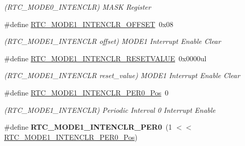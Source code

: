 \begin{DoxyCompactItemize}
\begin{DoxyCompactList}\small\item\em (R\+T\+C\+\_\+\+M\+O\+D\+E0\+\_\+\+I\+N\+T\+E\+N\+C\+L\+R) M\+A\+S\+K Register \end{DoxyCompactList}\item 
\hypertarget{group___s_a_m_l21___r_t_c_ga7c25664625a464e491e269a25d995f8b}{}\#define \hyperlink{group___s_a_m_l21___r_t_c_ga7c25664625a464e491e269a25d995f8b}{R\+T\+C\+\_\+\+M\+O\+D\+E1\+\_\+\+I\+N\+T\+E\+N\+C\+L\+R\+\_\+\+O\+F\+F\+S\+E\+T}~0x08\label{group___s_a_m_l21___r_t_c_ga7c25664625a464e491e269a25d995f8b}

\begin{DoxyCompactList}\small\item\em (R\+T\+C\+\_\+\+M\+O\+D\+E1\+\_\+\+I\+N\+T\+E\+N\+C\+L\+R offset) M\+O\+D\+E1 Interrupt Enable Clear \end{DoxyCompactList}\item 
\hypertarget{group___s_a_m_l21___r_t_c_ga3ee33f3e7ac38410b74c06f29bd3a912}{}\#define \hyperlink{group___s_a_m_l21___r_t_c_ga3ee33f3e7ac38410b74c06f29bd3a912}{R\+T\+C\+\_\+\+M\+O\+D\+E1\+\_\+\+I\+N\+T\+E\+N\+C\+L\+R\+\_\+\+R\+E\+S\+E\+T\+V\+A\+L\+U\+E}~0x0000ul\label{group___s_a_m_l21___r_t_c_ga3ee33f3e7ac38410b74c06f29bd3a912}

\begin{DoxyCompactList}\small\item\em (R\+T\+C\+\_\+\+M\+O\+D\+E1\+\_\+\+I\+N\+T\+E\+N\+C\+L\+R reset\+\_\+value) M\+O\+D\+E1 Interrupt Enable Clear \end{DoxyCompactList}\item 
\hypertarget{group___s_a_m_l21___r_t_c_ga268b4dd1de62d61e445271ee8a412e42}{}\#define \hyperlink{group___s_a_m_l21___r_t_c_ga268b4dd1de62d61e445271ee8a412e42}{R\+T\+C\+\_\+\+M\+O\+D\+E1\+\_\+\+I\+N\+T\+E\+N\+C\+L\+R\+\_\+\+P\+E\+R0\+\_\+\+Pos}~0\label{group___s_a_m_l21___r_t_c_ga268b4dd1de62d61e445271ee8a412e42}

\begin{DoxyCompactList}\small\item\em (R\+T\+C\+\_\+\+M\+O\+D\+E1\+\_\+\+I\+N\+T\+E\+N\+C\+L\+R) Periodic Interval 0 Interrupt Enable \end{DoxyCompactList}\item 
\hypertarget{group___s_a_m_l21___r_t_c_ga997aa570a915c4ed5e366816501e20c7}{}\#define {\bfseries R\+T\+C\+\_\+\+M\+O\+D\+E1\+\_\+\+I\+N\+T\+E\+N\+C\+L\+R\+\_\+\+P\+E\+R0}~(1 $<$$<$ \hyperlink{group___s_a_m_l21___r_t_c_ga268b4dd1de62d61e445271ee8a412e42}{R\+T\+C\+\_\+\+M\+O\+D\+E1\+\_\+\+I\+N\+T\+E\+N\+C\+L\+R\+\_\+\+P\+E\+R0\+\_\+\+Pos})\label{group___s_a_m_l21___r_t_c_ga997aa570a915c4ed5e366816501e20c7}


\end{DoxyCompactItemize}
